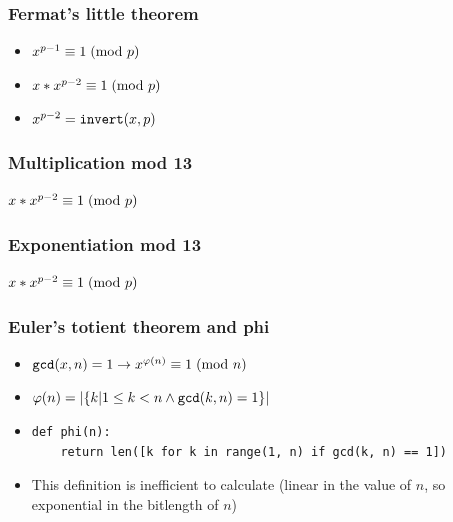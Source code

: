 \documentclass[aspectratio=169]{beamer}
\begin{document}
\begin{frame}[fragile]
\frametitle{Fermat's little theorem}
\begin{itemize}
\item $x^{p-1} \equiv 1\hspace{1mm}(\text{mod }p)$
\item $x*x^{p-2} \equiv 1\hspace{1mm}(\text{mod }p)$
\item $x^{p-2} = \verb|invert|(x, p)$
\end{itemize}
\end{frame}

\begin{frame}[fragile]
\frametitle{Multiplication mod 13}
$x*x^{p-2} \equiv 1\hspace{1mm}(\text{mod }p)$\\
{\scriptsize }
\end{frame}

\begin{frame}[fragile]
\frametitle{Exponentiation mod 13}
$x*x^{p-2} \equiv 1\hspace{1mm}(\text{mod }p)$\\
{\scriptsize }
\end{frame}

\begin{frame}[fragile]
\frametitle{Euler's totient theorem and phi}
\begin{itemize}
\item $\verb|gcd|(x, n) = 1 \rightarrow x^{\varphi(n)} \equiv 1\hspace{1mm}(\text{mod }n)$
\item $\varphi(n) = |\{k | 1 \le k < n \land \verb|gcd|(k, n) = 1\}|$
\item \begin{Verbatim}[fontsize=\scriptsize]
def phi(n):
    return len([k for k in range(1, n) if gcd(k, n) == 1])
\end{Verbatim}
\item This definition is inefficient to calculate (linear in the value of $n$, so exponential in the bitlength of $n$)
\end{itemize}
\end{frame}
\end{document}
